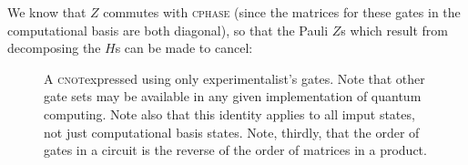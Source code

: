 \documentclass[a4paper, english]{scrartcl}
\providecommand{\cnot}{\textsc{cnot}}
\begin{document}
We know that $Z$ commutes with \textsc{cphase} (since the matrices for these gates in the computational basis are both diagonal), so that the Pauli $Z$s which result from decomposing the $H$s can be made to cancel:
\begin{figure}[!ht]
\centering

\caption{A \cnot expressed using only experimentalist's gates.
Note that other gate sets may be available in any given implementation of quantum computing.
Note also that this identity applies to all imput states, not just computational basis states.
Note, thirdly, that the order of gates in a circuit is the reverse of the order of matrices in a product. }
\end{figure}
\end{document}
